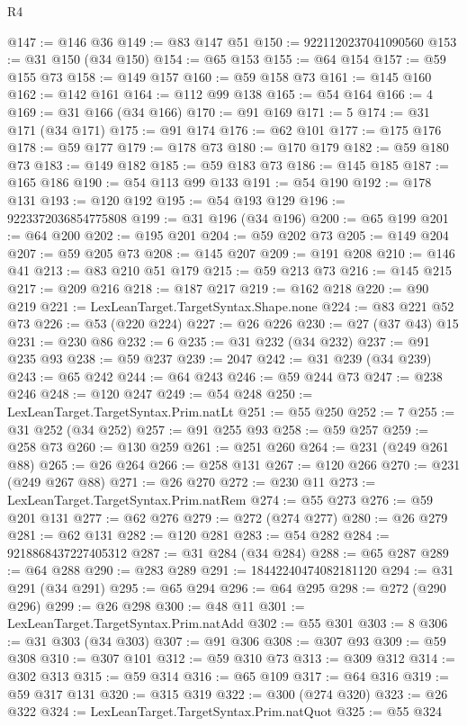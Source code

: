 \begin{lexlean}{R4}
\begin{coremodule}
@147 := @146 @36
@149 := @83 @147 @51
@150 := 9221120237041090560
@153 := @31 @150 (@34 @150)
@154 := @65 @153
@155 := @64 @154
@157 := @59 @155 @73
@158 := @149 @157
@160 := @59 @158 @73
@161 := @145 @160
@162 := @142 @161
@164 := @112 @99 @138
@165 := @54 @164
@166 := 4
@169 := @31 @166 (@34 @166)
@170 := @91 @169
@171 := 5
@174 := @31 @171 (@34 @171)
@175 := @91 @174
@176 := @62 @101
@177 := @175 @176
@178 := @59 @177
@179 := @178 @73
@180 := @170 @179
@182 := @59 @180 @73
@183 := @149 @182
@185 := @59 @183 @73
@186 := @145 @185
@187 := @165 @186
@190 := @54 @113 @99 @133
@191 := @54 @190
@192 := @178 @131
@193 := @120 @192
@195 := @54 @193 @129
@196 := 9223372036854775808
@199 := @31 @196 (@34 @196)
@200 := @65 @199
@201 := @64 @200
@202 := @195 @201
@204 := @59 @202 @73
@205 := @149 @204
@207 := @59 @205 @73
@208 := @145 @207
@209 := @191 @208
@210 := @146 @41
@213 := @83 @210 @51 @179
@215 := @59 @213 @73
@216 := @145 @215
@217 := @209 @216
@218 := @187 @217
@219 := @162 @218
@220 := @90 @219
@221 := LexLeanTarget.TargetSyntax.Shape.none
@224 := @83 @221 @52 @73
@226 := @53 (@220 @224)
@227 := @26 @226
@230 := @27 (@37 @43) @15
@231 := @230 @86
@232 := 6
@235 := @31 @232 (@34 @232)
@237 := @91 @235 @93
@238 := @59 @237
@239 := 2047
@242 := @31 @239 (@34 @239)
@243 := @65 @242
@244 := @64 @243
@246 := @59 @244 @73
@247 := @238 @246
@248 := @120 @247
@249 := @54 @248
@250 := LexLeanTarget.TargetSyntax.Prim.natLt
@251 := @55 @250
@252 := 7
@255 := @31 @252 (@34 @252)
@257 := @91 @255 @93
@258 := @59 @257
@259 := @258 @73
@260 := @130 @259
@261 := @251 @260
@264 := @231 (@249 @261 @88)
@265 := @26 @264
@266 := @258 @131
@267 := @120 @266
@270 := @231 (@249 @267 @88)
@271 := @26 @270
@272 := @230 @11
@273 := LexLeanTarget.TargetSyntax.Prim.natRem
@274 := @55 @273
@276 := @59 @201 @131
@277 := @62 @276
@279 := @272 (@274 @277)
@280 := @26 @279
@281 := @62 @131
@282 := @120 @281
@283 := @54 @282
@284 := 9218868437227405312
@287 := @31 @284 (@34 @284)
@288 := @65 @287
@289 := @64 @288
@290 := @283 @289
@291 := 18442240474082181120
@294 := @31 @291 (@34 @291)
@295 := @65 @294
@296 := @64 @295
@298 := @272 (@290 @296)
@299 := @26 @298
@300 := @48 @11
@301 := LexLeanTarget.TargetSyntax.Prim.natAdd
@302 := @55 @301
@303 := 8
@306 := @31 @303 (@34 @303)
@307 := @91 @306
@308 := @307 @93
@309 := @59 @308
@310 := @307 @101
@312 := @59 @310 @73
@313 := @309 @312
@314 := @302 @313
@315 := @59 @314
@316 := @65 @109
@317 := @64 @316
@319 := @59 @317 @131
@320 := @315 @319
@322 := @300 (@274 @320)
@323 := @26 @322
@324 := LexLeanTarget.TargetSyntax.Prim.natQuot
@325 := @55 @324

\end{coremodule}
\end{lexlean}
